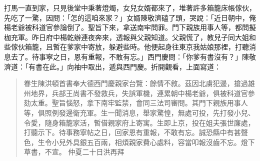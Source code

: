 打馬一直到家，只見後堂中秉著燈燭，女兒女婿都來了，堆著許多箱籠床帳傢伙，先吃了一驚，因問：「怎的這咱來家？」女婿陳敬濟磕了頭，哭說：「近日朝中，俺楊老爺被科道官參論倒了。聖旨下來，拿送南牢問罪。門下親族用事人等，都問擬枷充軍。昨日府中楊乾辦連夜奔來，透報與父親知道。父親慌了，教兒子同大姐和些傢伙箱籠，且暫在爹家中寄放，躲避些時。他便起身往東京我姑娘那裡，打聽消息去了。待事寧之日，恩有重報，不敢有忘。」西門慶問：「你爹有書沒有？」陳敬濟道：「有書在此。」向袖中取出，遞與西門慶。折開觀看，上面寫道：
\begin{quote}
眷生陳洪頓首書奉大德西門慶親家台覽：餘情不敘。茲因北虜犯邊，搶過雄州地界，兵部王尚書不發救兵，失誤軍機，連累朝中楊老爺，俱被科道官參劾太重。聖旨惱怒，拿下南牢監禁，會同三法司審問。其門下親族用事人等，俱照例發邊衛充軍。生一聞消息，舉家驚惶，無處可投，先打發小兒、令愛，隨身箱籠家活，暫借親家府上寄寓。生即上京，投在姐夫張世廉處，打聽示下。待事務寧帖之日，回家恩有重報，不敢有忘。誠恐縣中有甚聲色，生令小兒外具銀五百兩，相煩親家費心處料，容當叩報沒齒不忘。燈下草書，不宣。
仲夏二十日洪再拜
\end{quote}

